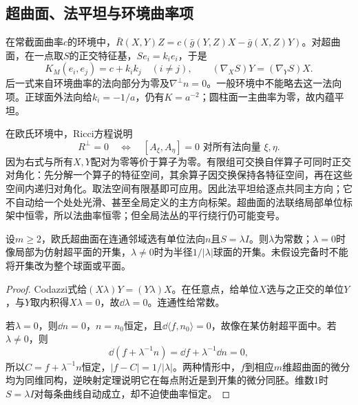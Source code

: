 \subsection*{超曲面、法平坦与环境曲率项}
在常截面曲率$c$的环境中，$\bar R(X,Y)Z=c(\bar g(Y,Z)X-\bar g(X,Z)Y)$。对超曲面，在一点取$S$的正交特征基，$Se_i=k_i e_i$，于是
\[
 K_M(e_i,e_j)=c+k_i k_j\quad(i\ne j),\qquad
 (\nabla_XS)Y=(\nabla_YS)X.
\]
后一式来自环境曲率的法向部分为零及$\nabla^\perp n=0$。一般环境中不能略去这一法向项。正球面外法向给$k_i=-1/a$，仍有$K=a^{-2}$；圆柱面一主曲率为零，故内蕴平坦。

在欧氏环境中，Ricci方程说明
\[
 R^\perp=0\quad\Longleftrightarrow\quad
 [A_\xi,A_\eta]=0\text{ 对所有法向量 }\xi,\eta.
\]
因为右式与所有$X,Y$配对为零等价于算子为零。有限组可交换自伴算子可同时正交对角化：先分解一个算子的特征空间，其余算子因交换保持各特征空间，再在这些空间内递归对角化。取法空间有限基即可应用。因此法平坦给逐点共同主方向；它不自动给一个处处光滑、甚至全局定义的主方向标架。超曲面的法联络局部单位标架中恒零，所以法曲率恒零；但全局法丛的平行绕行仍可能变号。

\begin{proposition}[欧氏全脐超曲面的局部分类]\label{prop:umbilic-classification}
设$m\geq2$，欧氏超曲面在连通邻域选有单位法向$n$且$S=\lambda I$。则$\lambda$为常数；$\lambda=0$时像局部为仿射超平面的开集，$\lambda\ne0$时为半径$1/|\lambda|$球面的开集。未假设完备时不能将开集改为整个球面或平面。
\end{proposition}
\begin{proof}
Codazzi式给$(X\lambda)Y=(Y\lambda)X$。在任意点，给单位$X$选与之正交的单位$Y$，与$Y$取内积得$X\lambda=0$，故$\dd\lambda=0$。连通性给常数。

若$\lambda=0$，则$\dd n=0$，$n=n_0$恒定，且$\dd\langle f,n_0\rangle=0$，故像在某仿射超平面中。若$\lambda\ne0$，则
\[
 \dd(f+\lambda^{-1}n)=\dd f+\lambda^{-1}\dd n=0,
\]
所以$C=f+\lambda^{-1}n$恒定，$|f-C|=1/|\lambda|$。两种情形中，$f$到相应$m$维超曲面的微分均为同维同构，逆映射定理说明它在每点附近是到开集的微分同胚。维数1时$S=\lambda I$对每条曲线自动成立，却不迫使曲率恒定。
\end{proof}
